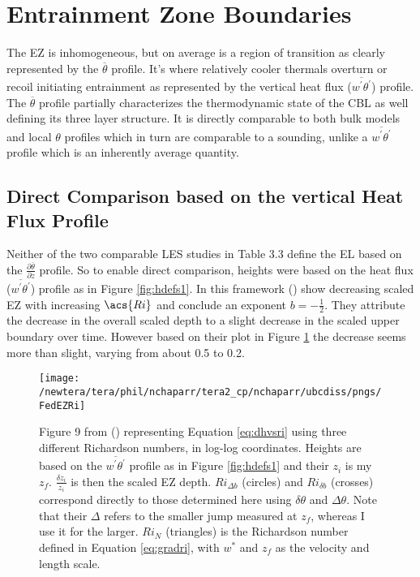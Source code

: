 \section{Entrainment Zone Boundaries}
\label{sec:ezbound}
The \acs{EZ} is inhomogeneous, but on average is a region of transition as clearly represented by the $\overline{\theta}$ profile.  It's where relatively cooler thermals overturn or recoil initiating entrainment as represented by the vertical heat flux ($\overline{w^{'}\theta^{'}}$) profile.  The $\overline{\theta}$ profile partially characterizes the thermodynamic state of the \acs{CBL} as well defining its three layer structure.  It is directly comparable to both bulk models and local $\theta$ profiles which in turn are comparable to a sounding, unlike a $\overline{w^{'}\theta^{'}}$ profile which is an inherently average quantity.\\

\subsection{Direct Comparison based on the vertical Heat Flux Profile}
\label{subsec:comphfl}
Neither of the two comparable \acs{LES} studies in Table 3.3 define the \acs{EL} based on the $\frac{\partial \overline{\theta}}{\partial z}$ profile.  So to enable direct comparison, heights were based on the heat flux ($\overline{w^{'}\theta^{'}}$) profile as in Figure \ref{fig:hdefs1}.  In this framework \citeauthor{FedConzMir04} (\citeyear{FedConzMir04}) show decreasing scaled \acs{EZ} with increasing $\acs{Ri}$ and conclude an exponent $b = -\frac{1}{2}$.  They attribute the decrease in the overall scaled depth to a slight decrease in the scaled upper boundary over time.  However based on their plot in Figure \ref{fig:FedEZRi} the decrease seems more than slight, varying from about 0.5 to 0.2.\\

\begin{figure}[htbp]
    \centering
    \texttt{[image: /newtera/tera/phil/nchaparr/tera2\_cp/nchaparr/ubcdiss/pngs/FedEZRi]}
    \caption[Plot of the Relationship between scaled \acs{EZ} Depth and Richardson Number from \citeauthor{FedConzMir04}'s (\citeyear{FedConzMir04})]{Figure 9 from \citeauthor{FedConzMir04} (\citeyear{FedConzMir04}) representing Equation \ref{eq:dhvsri} using three different Richardson numbers, in log-log coordinates.  Heights are based on the $\overline{w^{'}\theta^{'}}$ profile as in Figure \ref{fig:hdefs1} and their $z_{i}$ is my $z_{f}$. $\frac{\delta z_{i}}{z_{i}}$ is then the scaled \acs{EZ} depth. $Ri_{\Delta b}$ (circles) and $Ri_{\delta b}$ (crosses) correspond directly to those determined here using $\delta \theta$ and $\Delta \theta$.  Note that their $\Delta$ refers to the smaller jump measured at $z_{f}$, whereas I use it for the larger.  $Ri_{N}$ (triangles) is the Richardson number defined in Equation \ref{eq:gradri}, with $w^{*}$ and $z_{f}$ as the velocity and length scale.}
    \label{fig:FedEZRi}   %
\end{figure}


